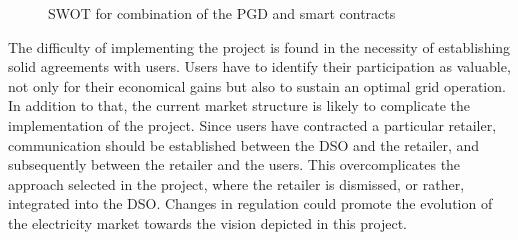 \begin{figure}[!htb] \centering
{}
\caption{SWOT for combination of the PGD and smart contracts}
\label{fig:swot}
\end{figure}
The difficulty of implementing the project is found in the necessity of establishing solid agreements with users. Users have to identify their participation as valuable, not only for their economical gains but also to sustain an optimal grid operation. In addition to that, the current market structure is likely to complicate the implementation of the project. Since users have contracted a particular retailer, communication should be established between the DSO and the retailer, and subsequently between the retailer and the users. This overcomplicates the approach selected in the project, where the retailer is dismissed, or rather, integrated into the DSO. Changes in regulation could promote the evolution of the electricity market towards the vision depicted in this project. 

